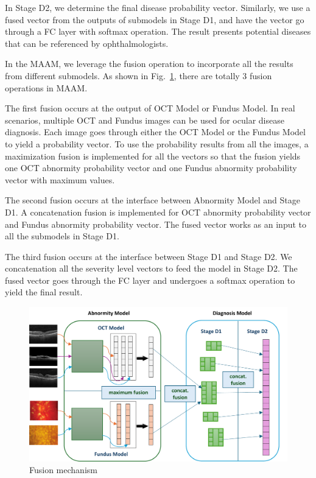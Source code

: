 \documentclass{article}
\begin{document}
	\vspace{0.2cm}

	\begin{multicols}{2}	
	In Stage D2, we determine the final disease probability vector. Similarly, we use a fused vector from the outputs of submodels in Stage D1, and have the vector go through a FC layer with softmax operation. The result presents potential diseases that can be referenced by ophthalmologists.

	\vspace{0.5cm}
	
	In the MAAM, we leverage the fusion operation to incorporate all the results from different submodels. As shown in Fig.~\ref{fig:fusion}, there are totally 3 fusion operations in MAAM.

	The first fusion occurs at the output of OCT Model or Fundus Model. In real scenarios, multiple OCT and Fundus images can be used for ocular disease diagnosis. Each image goes through either the OCT Model or the Fundus Model to yield a probability vector. To use the probability results from all the images, a maximization fusion is implemented for all the vectors so that the fusion yields one OCT abnormity probability vector and one Fundus abnormity probability vector with maximum values.
	
	The second fusion occurs at the interface between Abnormity Model and Stage D1. A concatenation fusion is implemented for OCT abnormity probability vector and Fundus abnormity probability vector. The fused vector works as an input to all the submodels in Stage D1.
	
	The third fusion occurs at the interface between Stage D1 and Stage D2. We concatenation all the severity level vectors to feed the model in Stage D2. The fused vector goes through the FC layer and undergoes a softmax operation to yield the final result.

	\end{multicols}

	\begin{figure}[htbp]
	\centering
	\includegraphics[width=\linewidth]{Figs/fusion.pdf}
	\caption{Fusion mechanism}
	\vspace{0.3cm}
	\label{fig:fusion}
	\end{figure}
	
\end{document}
